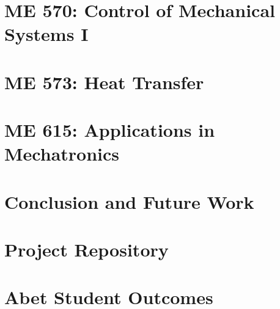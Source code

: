 \documentclass[12pt]{report}
\begin{document}
    \chapter{ME 570: Control of Mechanical Systems I}
    

    \chapter{ME 573: Heat Transfer}
    

    \chapter{ME 615: Applications in Mechatronics}
    
    
    \chapter{Conclusion and Future Work}
    

    \appendix
    \chapter{Project Repository}
    \label{appendix:appendix_github}
    

    \chapter{Abet Student Outcomes}
    \label{appendix:appendix_abet}
    


    
\end{document}
